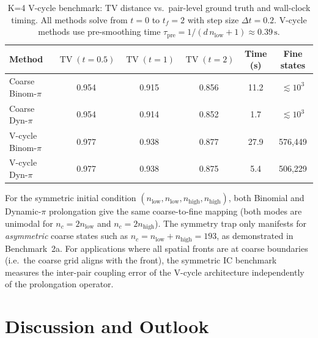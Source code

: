 \documentclass[review,onefignum,onetabnum]{siamart171218}
\newcommand{\TV}{\operatorname{TV}}
\begin{document}
\begin{table}[ht]
\centering
\caption{K=4 V-cycle benchmark: TV distance vs.\ pair-level
  ground truth and wall-clock timing.  All methods solve from
  $t=0$ to $t_f = 2$ with step size $\Delta t = 0.2$.
  V-cycle methods use pre-smoothing time
  $\tau_{\mathrm{pre}} = 1/(d\,n_{\mathrm{low}}+1) \approx 0.39\,\mathrm{s}$.}
\label{tab:vcycle-tv}
\small
\begin{tabular}{l|ccc|c|c}
\hline
Method & $\TV(t{=}0.5)$ & $\TV(t{=}1)$ & $\TV(t{=}2)$
       & Time (s) & Fine states \\
\hline
Coarse Binom-$\pi$  & 0.954 & 0.915 & 0.856 & 11.2  & $\lesssim 10^3$ \\
Coarse Dyn-$\pi$    & 0.954 & 0.914 & 0.852 &  1.7  & $\lesssim 10^3$ \\
V-cycle Binom-$\pi$ & 0.977 & 0.938 & 0.877 & 27.9  & 576{,}449 \\
V-cycle Dyn-$\pi$   & 0.977 & 0.938 & 0.875 &  5.4  & 506{,}229 \\
\hline
\end{tabular}
\end{table}

\begin{remark}
\label{rem:symmetric-ic}
For the symmetric initial condition $(n_{\mathrm{low}}, n_{\mathrm{low}},
n_{\mathrm{high}}, n_{\mathrm{high}})$, both Binomial and Dynamic-$\pi$
prolongation give the same coarse-to-fine mapping (both modes are
unimodal for $n_c = 2n_{\mathrm{low}}$ and $n_c = 2n_{\mathrm{high}}$).
The symmetry trap only manifests for \emph{asymmetric} coarse
states such as $n_c = n_{\mathrm{low}} + n_{\mathrm{high}} = 193$,
as demonstrated in Benchmark~2a.  For applications where all
spatial fronts are at coarse boundaries (i.e.\ the coarse grid
aligns with the front), the symmetric IC benchmark measures the
inter-pair coupling error of the V-cycle architecture
independently of the prolongation operator.
\end{remark}

\section{Discussion and Outlook}
\label{sec:discussion}
\end{document}
